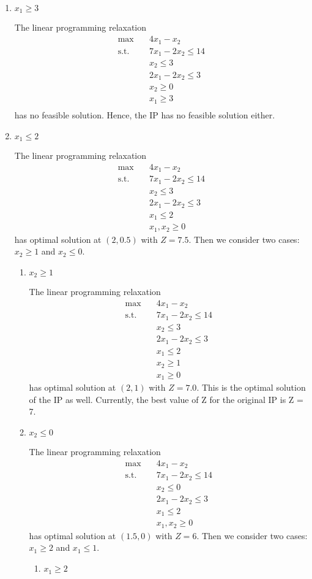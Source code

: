 \documentclass{homework}
\begin{document}
\begin{enumerate}
	\item $x_1 \geq 3$
	
	The linear programming relaxation
\begin{align*}
	\text{max} \quad
	&4x_1 - x_2 \\
	\text{s.t.} \quad
	&7x_1 - 2x_2 \leq 14 \\
	&x_2 \leq 3 \\
	&2x_1 - 2x_2 \leq 3 \\
	&x_2 \geq 0 \\
	&x_1 \geq 3 \\
\end{align*}
has no feasible solution. Hence, the IP has no feasible solution either.
\item $x_1 \leq 2$

The linear programming relaxation
\begin{align*}
	\text{max} \quad
	&4x_1 - x_2 \\
	\text{s.t.} \quad
	&7x_1 - 2x_2 \leq 14 \\
	&x_2 \leq 3 \\
	&2x_1 - 2x_2 \leq 3 \\
	&x_1 \leq 2 \\
	&x_1, x_2 \geq 0
\end{align*}
has optimal solution at $(2, 0.5)$ with $Z = 7.5$. Then we consider two cases: $x_2 \geq 1$ and $x_2 \leq 0.$
\begin{enumerate}[label*=\arabic*.]
\item $x_2 \geq 1$

The linear programming relaxation
\begin{align*}
	\text{max} \quad
	&4x_1 - x_2 \\
	\text{s.t.} \quad
	&7x_1 - 2x_2 \leq 14 \\
	&x_2 \leq 3 \\
	&2x_1 - 2x_2 \leq 3 \\
	&x_1 \leq 2 \\
	&x_2 \geq 1 \\
	&x_1 \geq 0
\end{align*}
has optimal solution at $(2, 1)$ with $Z = 7.0$. This is the optimal solution of the IP as well. Currently, the
best value of Z for the original IP is Z = 7.
\item $x_2 \leq 0$

The linear programming relaxation
\begin{align*}
	\text{max} \quad
	&4x_1 - x_2 \\
	\text{s.t.} \quad
	&7x_1 - 2x_2 \leq 14 \\
	&x_2 \leq 0 \\
	&2x_1 - 2x_2 \leq 3 \\
	&x_1 \leq 2 \\
	&x_1, x_2 \geq 0
\end{align*}
has optimal solution at $(1.5, 0)$ with $Z = 6$. Then we consider two cases: $x_1 \geq 2$ and $x_1 \leq 1.$
\begin{enumerate}[label*=\arabic*.]
\item $x_1 \geq 2$


\end{enumerate}
\end{enumerate}
\end{enumerate}
\end{document}
